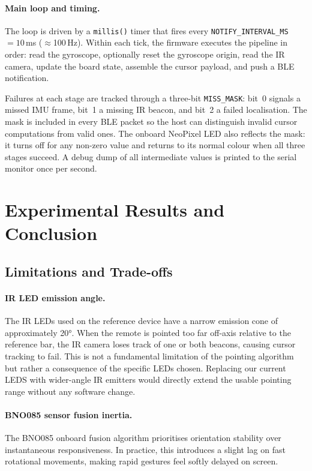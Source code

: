 \documentclass[12pt, a4paper]{article}
\begin{document}
\paragraph{Main loop and timing.}
The loop is driven by a \texttt{millis()} timer that fires every \texttt{NOTIFY\_INTERVAL\_MS}\,$= 10$\,ms ($\approx$100\,Hz). Within each tick, the firmware executes the pipeline in order: read the gyroscope, optionally reset the gyroscope origin, read the IR camera, update the board state, assemble the cursor payload, and push a BLE notification.

Failures at each stage are tracked through a three-bit \texttt{MISS\_MASK}: bit~0 signals a missed IMU frame, bit~1 a missing IR beacon, and bit~2 a failed localisation. The mask is included in every BLE packet so the host can distinguish invalid cursor computations from valid ones. The onboard NeoPixel LED also reflects the mask: it turns off for any non-zero value and returns to its normal colour when all three stages succeed. A debug dump of all intermediate values is printed to the serial monitor once per second.

\section{Experimental Results and Conclusion}

\subsection{Limitations and Trade-offs}

\paragraph{IR LED emission angle.}
The IR LEDs used on the reference device have a narrow emission cone of approximately 20°. When the remote is pointed too far off-axis relative to the reference bar, the IR camera loses track of one or both beacons, causing cursor tracking to fail. This is not a fundamental limitation of the pointing algorithm but rather a consequence of the specific LEDs chosen. Replacing our current LEDS with wider-angle IR emitters would directly extend the usable pointing range without any software change.

\paragraph{BNO085 sensor fusion inertia.}
The BNO085 onboard fusion algorithm prioritises orientation stability over instantaneous responsiveness. In practice, this introduces a slight lag on fast rotational movements, making rapid gestures feel softly delayed on screen.
\end{document}
